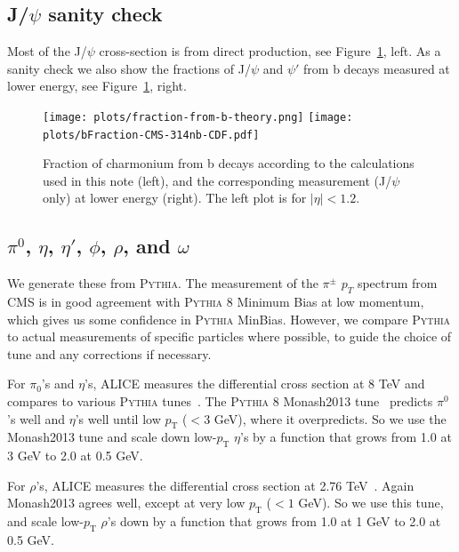 \documentclass[12pt]{article}
\newcommand{\pythia}{\textsc{Pythia}\xspace}
\begin{document}
\subsection{J/$\psi$ sanity check}
\label{sec:psiSanity}

Most of the J/$\psi$ cross-section is from direct production, see
Figure~\ref{fig:sanity}, left.  As a sanity check we also show
the fractions of J/$\psi$ and $\psi'$ from b decays measured
at lower energy, see 
Figure~\ref{fig:sanity}, right\cite{Khachatryan:2010yr}.

\begin{figure}
\texttt{[image: plots/fraction-from-b-theory.png]}
\texttt{[image: plots/bFraction-CMS-314nb-CDF.pdf]}
\caption{Fraction of charmonium from b decays according to the calculations used in
  this note (left), and the corresponding measurement (J/$\psi$ only) at lower energy (right).
 The left plot is for $|\eta|<1.2$.}
  \label{fig:sanity}
\end{figure}



\subsection{$\pi^0$, $\eta$, $\eta'$, $\phi$, $\rho$, and $\omega$}
\label{sec:mesons}

We generate these from \pythia.  The measurement of the 
$\pi^{\pm}$
$p_T$ spectrum from CMS\cite{Sirunyan:2017zmn} is in good agreement
with \pythia 8 Minimum Bias at low momentum, which gives us some
confidence in \pythia MinBias. However, we compare \pythia to actual
measurements of specific particles where possible, to guide the choice
of tune and any corrections if necessary.

For $\pi_0$'s and $\eta$'s, ALICE measures the differential cross section 
at 8 TeV and compares to various \pythia tunes~\cite{ALICE:eta}.
The \pythia 8 Monash2013 tune~\cite{Monash} predicts $\pi^0$'s well and
$\eta$'s well until low $p_\mathrm{T}$ ($<$3 GeV), where it overpredicts.
So we use the Monash2013 tune and scale down low-$p_\mathrm{T}$ $\eta$'s
by a function that grows from 1.0 at 3 GeV to 2.0 at 0.5 GeV.

For $\rho$'s, ALICE measures the differential cross section at 2.76 TeV~\cite{ALICE:rho}.
Again Monash2013 agrees well, except at very low $p_\mathrm{T}$ ($<1$ GeV).
So we use this tune, and scale low-$p_\mathrm{T}$ $\rho$'s down by a function
that grows from 1.0 at 1 GeV to 2.0 at 0.5 GeV.
\end{document}

